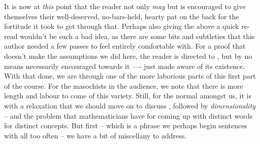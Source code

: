 It is now at \emph{this} point that the reader not only \emph{may} but is encouraged to give themselves their well-deserved, no-bars-held, hearty pat on the back for the fortitude it took to get through that. Perhaps also giving the above a quick re-read wouldn't be such a bad idea, as there are some bits and subtleties that this author needed a few passes to feel entirely comfortable with. For a proof that doesn't make the assumptions we did here, the reader is directed to \cite{knight_definable_1986}, but by no means necessarily encouraged towards it —- just made aware of its existence. With that done, we are through one of the more laborious parts of this first part of the course. For the masochists in the audience, we note that there is more length and labour to come of this variety. Still, for the normal amongst us, it is with a relaxation that we should move on to discuss \emph{}, followed by \emph{dimensionality} -- and the problem that mathematicians have for coming up with distinct words for distinct concepts. But first -- which is a phrase we perhaps begin sentences with all too often -- we have a bit of miscellany to address.
